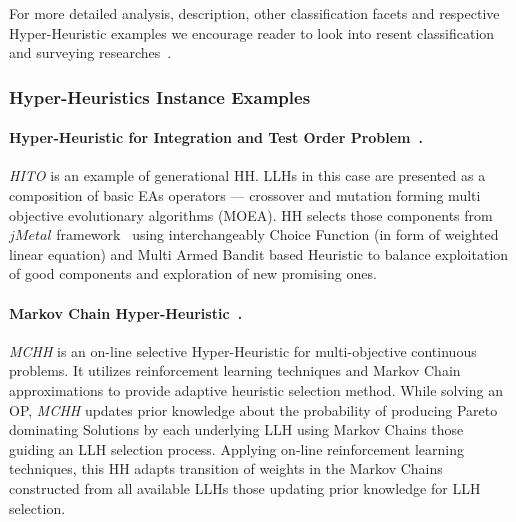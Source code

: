 
	


For more detailed analysis, description, other classification facets and respective Hyper-Heuristic examples we encourage reader to look into resent classification and surveying researches~\cite{burke2003hyper,ryser2014review,drake2019recent,burke2019classification}.

\subsubsection{Hyper-Heuristics Instance Examples}\label{bg: hh examples}
\paragraph{Hyper-Heuristic for Integration and Test Order Problem~\cite{guizzo2015hyper}.} \textit{HITO} is an example of generational HH. LLHs in this case are presented as a composition of basic EAs operators — crossover and mutation forming multi objective evolutionary algorithms (MOEA). HH selects those components from $jMetal$ framework~\cite{durillo2011jmetal} using interchangeably Choice Function (in form of weighted linear equation) and Multi Armed Bandit based Heuristic to balance exploitation of good components and exploration of new promising ones.


\paragraph{Markov Chain Hyper-Heuristic~\cite{mcclymont2011markov}.} \textit{MCHH} is an on-line selective Hyper-Heuristic for multi-objective continuous problems. It utilizes reinforcement learning techniques and Markov Chain approximations to provide adaptive heuristic selection method. While solving an OP, \textit{MCHH} updates prior knowledge about the probability of producing Pareto dominating Solutions by each underlying LLH using Markov Chains those guiding an LLH selection process. Applying on-line reinforcement learning techniques, this HH adapts transition of weights in the Markov Chains constructed from all available LLHs those updating prior knowledge for LLH selection.


